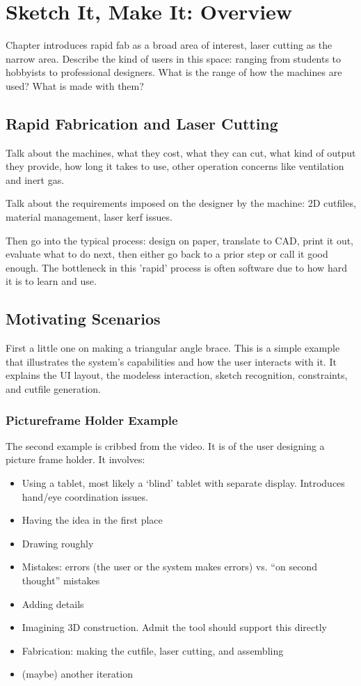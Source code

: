 \chapter{Sketch It, Make It: Overview}

Chapter introduces rapid fab as a broad area of interest, laser
cutting as the narrow area. Describe the kind of users in this space:
ranging from students to hobbyists to professional designers. What is
the range of how the machines are used? What is made with them?

\section{Rapid Fabrication and Laser Cutting}

Talk about the machines, what they cost, what they can cut, what kind
of output they provide, how long it takes to use, other operation
concerns like ventilation and inert gas.

Talk about the requirements imposed on the designer by the machine: 2D
cutfiles, material management, laser kerf issues. 

Then go into the typical process: design on paper, translate to CAD,
print it out, evaluate what to do next, then either go back to a prior
step or call it good enough. The bottleneck in this 'rapid' process is
often software due to how hard it is to learn and use.

\section{Motivating Scenarios}

First a little one on making a triangular angle brace. This is a
simple example that illustrates the system's capabilities and how the
user interacts with it. It explains the UI layout, the modeless
interaction, sketch recognition, constraints, and cutfile generation.

\subsection{Pictureframe Holder Example}

The second example is cribbed from the video. It is of the user
designing a picture frame holder. It involves:

\begin{itemize}
\item Using a tablet, most likely a `blind' tablet with separate
  display. Introduces hand/eye coordination issues.
\item Having the idea in the first place
\item Drawing roughly
\item Mistakes: errors (the user or the system makes errors) vs. ``on
  second thought'' mistakes
\item Adding details
\item Imagining 3D construction. Admit the tool should support this
  directly
\item Fabrication: making the cutfile, laser cutting, and assembling
\item (maybe) another iteration
\end{itemize}

